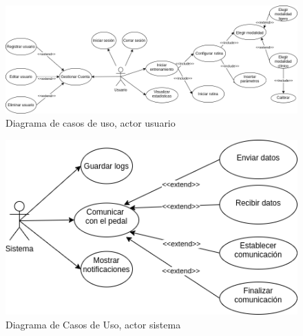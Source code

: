 \vspace*{50pt}
\begin{figure}[h]
    \centering
    \includegraphics[scale=0.44]{images/diagram-usecase-user.png}
    \caption{Diagrama de casos de uso, actor usuario}
    \label{fig: use-cases-user}
\end{figure}

\vspace*{50pt}
\begin{figure}[h]
    \centering
    \includegraphics[scale=0.44]{images/diagram-usecase-system.png}
    \caption{Diagrama de Casos de Uso, actor sistema}
    \label{fig: use-cases-system}
\end{figure}